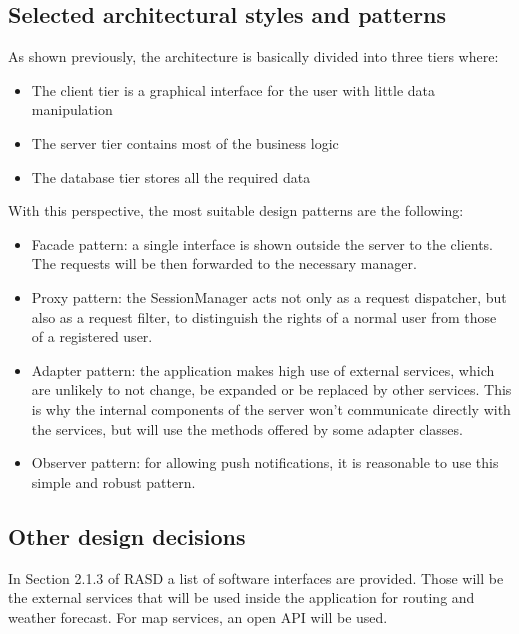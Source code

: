 \subsection{Selected architectural styles and patterns}

As shown previously, the architecture is basically divided into three tiers where:

\begin{itemize}
	\item The client tier is a graphical interface for the user with little data manipulation
	\item The server tier contains most of the business logic
	\item The database tier stores all the required data
\end{itemize}

With this perspective, the most suitable design patterns are the following:
\begin{itemize}
	\item Facade pattern: a single interface is shown outside the server to the clients. The requests will be then forwarded to the necessary manager.
	\item Proxy pattern: the SessionManager acts not only as a request dispatcher, but also as a request filter, to distinguish the rights of a normal user from those of a registered user.
	\item Adapter pattern: the application makes high use of external services, which are unlikely to not change, be expanded or be replaced by other services. This is why the internal components of the server won’t communicate directly with the services, but will use the methods offered by some adapter classes.
	\item Observer pattern: for allowing push notifications, it is reasonable to use this simple and robust pattern.
\end{itemize}

\subsection{Other design decisions}

In Section 2.1.3 of RASD a list of software interfaces are provided. Those will be the external services that will be used inside the application for routing and weather forecast. For map services, an open API will be used.
